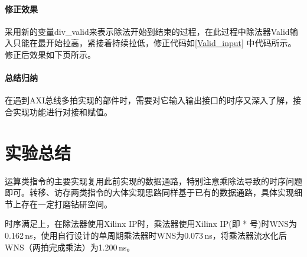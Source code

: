 \documentclass[UTF-8,twoside,c5size]{ctexart}
\begin{document}
	\paragraph{修正效果}\hfill
	
	采用新的变量div\_valid来表示除法开始到结束的过程，在此过程中除法器Valid输入只能在最开始拉高，紧接着持续拉低，修正代码如\ref{Valid_input} 中代码所示。修正后效果如下页所示。
	
	\paragraph{总结归纳}\hfill
	
	在遇到AXI总线多拍实现的部件时，需要对它输入输出接口的时序又深入了解，接合实现功能进行对接和赋值。
	
	\section{实验总结}
	
	运算类指令的主要实现复用此前实现的数据通路，特别注意乘除法导致的时序问题即可。转移、访存两类指令的大体实现思路同样基于已有的数据通路，具体实现细节上存在一定打磨钻研空间。
	
	时序满足上，在除法器使用Xilinx IP时，乘法器使用Xilinx IP(即 * 号)时WNS为0.162\,ns，使用自行设计的单周期乘法器时WNS为0.073\,ns，将乘法器流水化后WNS（两拍完成乘法）为1.200\,ns。
	
\end{document}

